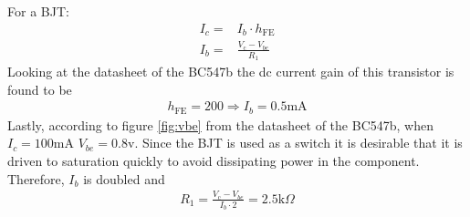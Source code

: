 For a BJT:
\begin{eqnarray}
I_c=&I_b\cdot h_{\text{FE}}\\
I_b=&\frac{V_{\text{c}}-V_{be}}{R_1}
\end{eqnarray}
Looking at the datasheet of the BC547b the dc current gain of this transistor is found to be
\begin{eqnarray}
	h_{\text{FE}}=200 \Rightarrow I_b = 0.5\text{mA}
\end{eqnarray}
Lastly, according to figure \ref{fig:vbe} from the datasheet of the BC547b, when $I_c = 100$mA $V_{be}=0.8$v.
Since the BJT is used as a switch it is desirable that it is driven to saturation quickly to avoid dissipating power in the component. Therefore, $I_b$ is doubled and 
\begin{eqnarray}
	R_1 = \frac{V_{\text{c}}-V_{be}}{I_b\cdot 2} = 2.5\text{k}\Omega
\end{eqnarray}

